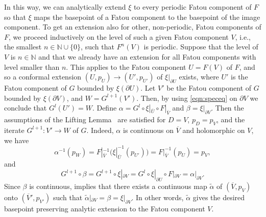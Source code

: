 \documentclass[12pt]{amsart}
\newcommand{\C}{\mathbb{C}}
\newcommand{\N}{\mathbb{N}}
\newcommand{\ra}{\rightarrow}
\newcommand{\hC}{\widehat{\C}}
\newcommand{\J}{\mathcal{J}}
\newcommand{\co}{\colon}
\begin{document}
 
 In this way,  we can analytically extend $\xi$ to every periodic Fatou component of $F$ so that $\xi$ maps the  basepoint of a Fatou component to the basepoint of the image component.
 To get an extension also for other, non-periodic, Fatou components of $F$, we proceed inductively
 on the level of such a given Fatou component $V$, i.e., the smallest $n\in\N\cup\{0\}$, such that $F^n(V)$ is periodic. Suppose that the level of $V$ is $n\in\N$ and that
 we already have an extension
 for all Fatou components with level smaller than $n$. This applies to the Fatou component
 $U=F(V)$ of $F$, and so a  conformal extension  $(U, p_U)\ra ( U',  p_{U'})$ of $\xi|_{\partial U}$ exists, where $U'$ is the Fatou component of $G$ bounded by $\xi(\partial U)$.
 Let $V'$ be the Fatou component of $G$ bounded by $\xi(\partial V)$, and $W=G^{l+1}(V')$.
 Then, by using \eqref{eqn:speceq} on $\partial V$ we conclude that $G^l(U')=W$.
 Define $\alpha=G^l\circ \xi|_{\overline U}\circ F|_{\overline V}$ and
 $\beta=\xi|_{\partial V}$. Then the assumptions of the Lifting Lemma~\cite[Lemma 3.4]{BLM} are satisfied for $D=V$, $p_D=p_{V}$, and the iterate
 $G^{l+1}\co V'\ra W$ of $G$. Indeed, $\alpha$ is continuous on $\overline V$ and holomorphic
 on $V$, we have
 $$\alpha^{-1}(p_W)=F|_{\overline V}^{-1}(  \xi|_{\overline U}^{-1}( p_{U'}))=F|_{\overline V}^{-1}(p_U)=p_V,$$
 and
 $$G^{l+1}\circ \beta= G^{l+1}\circ  \xi|_{\partial V}= G^{l}\circ \xi|_{\partial U}\circ F|_{\partial V}
 =\alpha|_{\partial V}.$$ Since $\beta$ is continuous, \cite[Lemma 3.4]{BLM} implies that there exists a continuous map $\widetilde \alpha$  of $(\overline V, p_V)$ onto $(\overline V', p_{V'})$ such that $\widetilde \alpha|_{\partial V}=\beta=\xi|_{\partial V}$. In other words,
 $\widetilde \alpha$ gives the desired basepoint preserving analytic extension to the Fatou component $V$.

 
 
  
\end{document}
